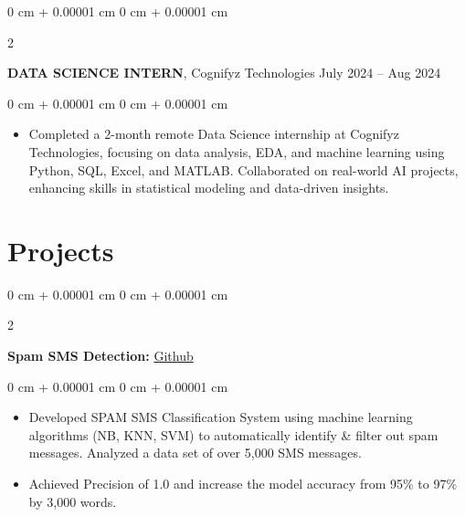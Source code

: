 \documentclass[10pt, letterpaper]{article}
\newenvironment{highlights}{
    \begin{itemize}[
        topsep=0.10 cm,
        parsep=0.10 cm,
        partopsep=0pt,
        itemsep=0pt,
        leftmargin=0 cm + 10pt
    ]
}{
    \end{itemize}
} %
\newenvironment{onecolentry}{
    \begin{adjustwidth}{
        0 cm + 0.00001 cm
    }{
        0 cm + 0.00001 cm
    }
}{
    \end{adjustwidth}
} %
\newenvironment{twocolentry}[2][]{
    \onecolentry
    \def\secondColumn{#2}
    \setcolumnwidth{\fill, 4.5 cm}
    \begin{paracol}{2}
}{
    \switchcolumn \raggedleft \secondColumn
    \end{paracol}
    \endonecolentry
} %
\begin{document}
\vspace{2 pt}

  \begin{twocolentry}{
            July 2024 – Aug 2024
        }
            \textbf{DATA SCIENCE INTERN}, Cognifyz Technologies\end{twocolentry}

        \vspace{0.10 cm}
        \begin{onecolentry}
            \begin{highlights}
                \item Completed a 2-month remote Data Science internship at Cognifyz Technologies, focusing on data analysis, EDA, and machine learning using Python, SQL, Excel, and MATLAB. Collaborated on real-world AI projects, enhancing skills in statistical modeling and data-driven insights.
            \end{highlights}
        \end{onecolentry}

        \vspace{5 pt}

    
    \section{Projects}



        
        \begin{twocolentry}{
            \href{https://github.com/Ishan10123/Spam-SMS-Project}{Github}
        }
            \textbf{Spam SMS Detection:}\end{twocolentry}

        \vspace{0.10 cm}
        \begin{onecolentry}
            \begin{highlights}
                \item Developed SPAM SMS Classification System using machine learning algorithms (NB, KNN, SVM) to
automatically identify \& filter out spam messages. Analyzed a data set of over 5,000 SMS messages.
                \item Achieved Precision of 1.0 and increase the model accuracy from 95\% to 97\% by 3,000 words.
            \end{highlights}
        \end{onecolentry}


        \vspace{2 pt}
\end{document}
